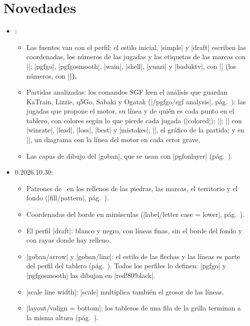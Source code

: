 \section{Novedades}
\label{sec:novedades}


\begin{itemize}
	\item \pgfgoversion:
		\begin{itemize}
			\item Las fuentes van con el perfil: el estilo inicial, |simple| y |draft| escriben las coordenadas, los números de las jugadas y las etiquetas de las marcas con |\normalfont|; |pgfgo|, |pgfgosmooth|, |wain|, |shell|, |yunzi| y |baduktv|, con |\sffamily| (los números, con |\sffamily\bfseries|).
			\item Partidas analizadas: los comandos SGF leen el análisis que guardan KaTrain, Lizzie, q5Go, Sabaki y Ogatak (|/pgfgo/sgf analysis|, pág.~\pageref{subsec:sgfanalisis}): las jugadas que propone el motor, su línea y de quién es cada punto en el tablero, con colores según lo que pierde cada jugada (|colored|); |\pgfgocandidates|; |\sgfinfo| con |winrate|, |lead|, |loss|, |best| y |mistakes|; |\sgfgraph|, el gráfico de la partida; y en |\sgfdiagrams|, un diagrama con la línea del motor en cada error grave.
			\item Las capas de dibujo del |goban|, que se usan con |pgfonlayer| (pág.~\pageref{subsec:capas}).
		\end{itemize}
	\item 0.2026.10.30:
		\begin{itemize}
			\item Patrones de \tikzname\ en los rellenos de las piedras, las marcas, el territorio y el fondo (|fill/pattern|, pág.~\pageref{sec:piedras}).
			\item Coordenadas del borde en minúsculas (|label/letter case = lower|, pág.~\pageref{subsec:etiquetas}).
			\item El perfil |draft|: blanco y negro, con líneas finas, sin el borde del fondo y con rayas donde hay relleno.
			\item |goban/arrow| y |goban/line|: el estilo de las flechas y las líneas es parte del perfil del tablero (pág.~\pageref{subsec:flechas}). Todos los perfiles lo definen: |pgfgo| y |pgfgosmooth| las dibujan en |red!80!black|.
			\item |scale line width|: |scale| multiplica también el grosor de las líneas.
			\item |layout/valign = bottom|: los tableros de una fila de la grilla terminan a la misma altura (pág.~\pageref{subsec:disposicion}).

\end{itemize}
\end{itemize}
